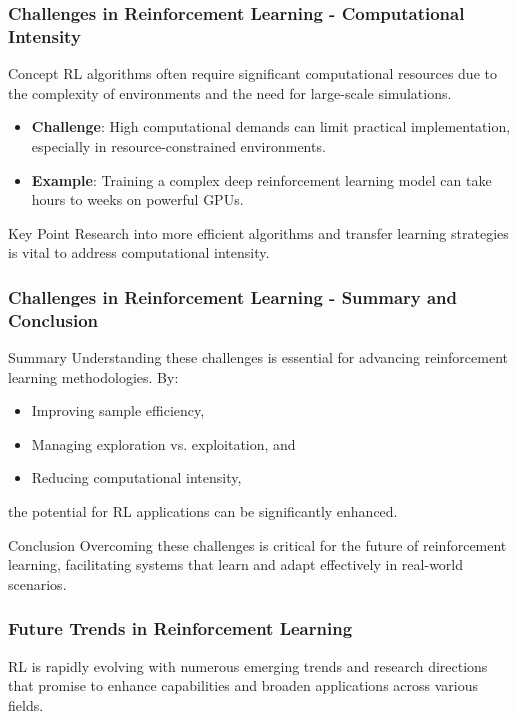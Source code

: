 \documentclass{beamer}
\begin{document}
\begin{frame}[fragile]
    \frametitle{Challenges in Reinforcement Learning - Computational Intensity}
    \begin{block}{Concept}
        RL algorithms often require significant computational resources due to the complexity of environments and the need for large-scale simulations.
    \end{block}
    \begin{itemize}
        \item \textbf{Challenge}: High computational demands can limit practical implementation, especially in resource-constrained environments.
        \item \textbf{Example}: Training a complex deep reinforcement learning model can take hours to weeks on powerful GPUs.
    \end{itemize}
    \begin{block}{Key Point}
        Research into more efficient algorithms and transfer learning strategies is vital to address computational intensity.
    \end{block}
\end{frame}

\begin{frame}[fragile]
    \frametitle{Challenges in Reinforcement Learning - Summary and Conclusion}
    \begin{block}{Summary}
        Understanding these challenges is essential for advancing reinforcement learning methodologies. 
        By:
        \begin{itemize}
            \item Improving sample efficiency,
            \item Managing exploration vs. exploitation, and
            \item Reducing computational intensity,
        \end{itemize}
        the potential for RL applications can be significantly enhanced.
    \end{block}
    \begin{block}{Conclusion}
        Overcoming these challenges is critical for the future of reinforcement learning, facilitating systems that learn and adapt effectively in real-world scenarios.
    \end{block}
\end{frame}

\begin{frame}[fragile]
    \frametitle{Future Trends in Reinforcement Learning}
    RL is rapidly evolving with numerous emerging trends and research directions that promise to enhance capabilities and broaden applications across various fields.
\end{frame}
\end{document}
